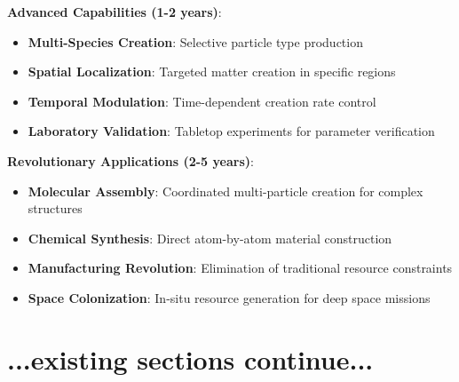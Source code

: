 \documentclass[11pt]{article}
\begin{document}
\textbf{Advanced Capabilities (1-2 years)}:
\begin{itemize}
\item \textbf{Multi-Species Creation}: Selective particle type production
\item \textbf{Spatial Localization}: Targeted matter creation in specific regions
\item \textbf{Temporal Modulation}: Time-dependent creation rate control
\item \textbf{Laboratory Validation}: Tabletop experiments for parameter verification
\end{itemize}

\textbf{Revolutionary Applications (2-5 years)}:
\begin{itemize}
\item \textbf{Molecular Assembly}: Coordinated multi-particle creation for complex structures
\item \textbf{Chemical Synthesis}: Direct atom-by-atom material construction
\item \textbf{Manufacturing Revolution}: Elimination of traditional resource constraints
\item \textbf{Space Colonization}: In-situ resource generation for deep space missions
\end{itemize}

\section{...existing sections continue...}
\end{document}

